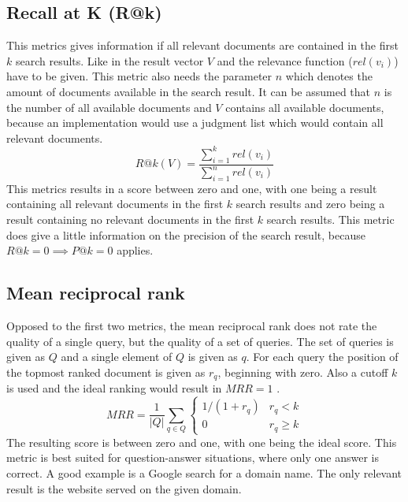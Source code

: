 \subsection{Recall at K (R@k)}
\label{ref:qa:offlinemetrics:ratk}
This metrics gives information if all relevant documents are contained in the first $k$ search results.
Like in  the result vector $V$ and the relevance function ($rel(v_i)$) have to be given.
This metric also needs the parameter $n$ which denotes the amount of documents available in the search result.\cite[P. 417]{mcsherry_najork_2008}
It can be assumed that $n$ is the number of all available documents and $V$ contains all available documents,
because an implementation would use a judgment list which would contain all relevant documents.
\begin{equation}
	R@k(V) = \frac{\sum_{i=1}^{k} rel(v_i)}{\sum_{i=1}^{n} rel(v_i)}
\end{equation}
This metrics results in a score between zero and one, with one being a result containing all relevant documents in the first $k$ search results
and zero being a result containing no relevant documents in the first $k$ search results.
This metric does give a little information on the precision of the search result, 
because $R@k=0 \implies P@k=0$ applies.

\subsection{Mean reciprocal rank}
\label{ref:qa:offlinemetrics:mrr}
Opposed to the first two metrics, the mean reciprocal rank does not rate the quality of a single query,
but the quality of a set of queries.
The set of queries is given as $Q$ and a single element of $Q$ is given as $q$.
For each query the position of the topmost ranked document is given as $r_q$, beginning with zero.
Also a cutoff $k$ is used and the ideal ranking would result in $MRR=1$ \cite[P. 89]{chakrabarti_khanna_sawant_bhattacharyya_2008}.
\begin{equation}
	MRR = \frac{1}{| Q |}\sum_{q \in Q}
	\begin{cases}
		1/(1+r_q) & r_q < k    \\
		0         & r_q \geq k 
	\end{cases}
\end{equation}
The resulting score is between zero and one, with one being the ideal score.
This metric is best suited for question-answer situations, where only one answer is correct.
A good example is a Google search for a domain name. The only relevant result is the website served on the given domain.

